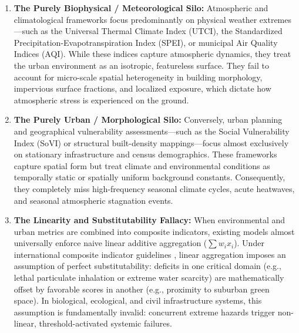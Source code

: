 \begin{enumerate}
    \item \textbf{The Purely Biophysical / Meteorological Silo:} Atmospheric and climatological frameworks focus predominantly on physical weather extremes---such as the Universal Thermal Climate Index (UTCI), the Standardized Precipitation-Evapotranspiration Index (SPEI), or municipal Air Quality Indices (AQI). While these indices capture atmospheric dynamics, they treat the urban environment as an isotropic, featureless surface. They fail to account for micro-scale spatial heterogeneity in building morphology, impervious surface fractions, and localized exposure, which dictate how atmospheric stress is experienced on the ground.
    \item \textbf{The Purely Urban / Morphological Silo:} Conversely, urban planning and geographical vulnerability assessments---such as the Social Vulnerability Index (SoVI) or structural built-density mappings---focus almost exclusively on stationary infrastructure and census demographics. These frameworks capture spatial form but treat climate and environmental conditions as temporally static or spatially uniform background constants. Consequently, they completely miss high-frequency seasonal climate cycles, acute heatwaves, and seasonal atmospheric stagnation events.
    \item \textbf{The Linearity and Substitutability Fallacy:} When environmental and urban metrics are combined into composite indicators, existing models almost universally enforce naive linear additive aggregation ($\sum w_i x_i$). Under international composite indicator guidelines \citep{oecd2008handbook}, linear aggregation imposes an assumption of perfect substitutability: deficits in one critical domain (e.g., lethal particulate inhalation or extreme water scarcity) are mathematically offset by favorable scores in another (e.g., proximity to suburban green space). In biological, ecological, and civil infrastructure systems, this assumption is fundamentally invalid: concurrent extreme hazards trigger non-linear, threshold-activated systemic failures.
\end{enumerate}

